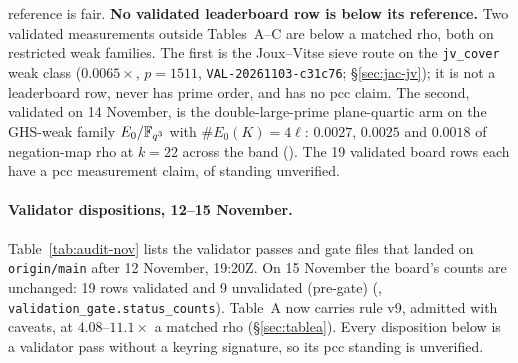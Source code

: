 reference is fair. \textbf{No validated leaderboard row is below its
reference.} Two validated measurements outside Tables~A--C are
below a matched rho, both on restricted weak families. The first is the
Joux--Vitse sieve route on the \texttt{jv\_cover} weak class
($0.0065\times$, $p=1511$, \texttt{VAL-20261103-c31c76};
\S\ref{sec:jac-jv}); it is not a leaderboard row, never has prime order,
and has no pcc claim. The second, validated on 14 November, is the
double-large-prime plane-quartic arm on the GHS-weak family
$E_0/\mathbb{F}_{q^3}$ with $\#E_0(K)=4\ell$: $0.0027$, $0.0025$ and $0.0018$ of
negation-map rho at $k=22$ across the band
().
The 19 validated board rows each
have a pcc measurement claim, of standing unverified.

\paragraph{Validator dispositions, 12--15 November.}
Table~\ref{tab:audit-nov} lists the validator passes and gate files that
landed on \texttt{origin/main} after 12 November, 19:20Z. On 15 November
the board's counts are unchanged: 19 rows validated and 9 unvalidated
(pre-gate) (,
\texttt{validation\_gate.status\_counts}). Table~A now carries rule v9,
admitted with caveats, at $4.08$--$11.1\times$ a matched rho
(\S\ref{sec:tablea}). Every disposition below is a validator pass without a
keyring signature, so its pcc standing is unverified.

